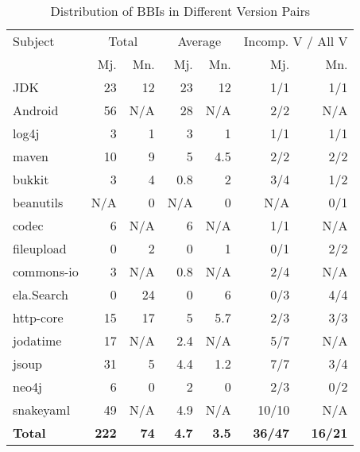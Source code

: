 \begin{table}
	\center 
	\caption{\label{table:incompVersions} Distribution of BBIs in Different Version Pairs}
		
		
	\begin{tabular}{|l|r|r|r|r|r|r|}
		\hline 
        Subject& 
        \multicolumn{2}{c|}{Total} & \multicolumn{2}{c|}{Average} & \multicolumn{2}{c|}{Incomp. V / All V}\\
        \cline{2-7}
                & Mj. & Mn. & Mj.  & Mn. & Mj. & Mn.        \\
        \hline
		JDK &  23 & 12 & 23 & 12   &  1/1 & 1/1  \\
		Android & 56 & N/A & 28 & N/A  & 2/2 &  N/A \\ %
		log4j  & 3  & 1 & 3  &  1   &  1/1 & 1/1  \\
		maven  &  10  & 9  & 5 & 4.5  & 2/2  & 2/2 \\
		bukkit & 3 & 4 & 0.8 & 2  & 3/4  & 1/2 \\
		beanutils & N/A & 0 & N/A & 0  & N/A &  0/1 \\
		codec & 6 &  N/A & 6 &  N/A &  1/1 & N/A \\
		fileupload & 0 & 2 & 0 & 1  & 0/1  & 2/2  \\
		commons-io  &  3 & N/A  & 0.8 & N/A &  2/4 & N/A  \\
		ela.Search  & 0  & 24 & 0 & 6  & 0/3 & 4/4 \\
		http-core &15  & 17 & 5 & 5.7 & 2/3 & 3/3 \\		
		jodatime  & 17 & N/A & 2.4 & N/A  &5/7  & N/A \\
		jsoup  & 31 & 5 & 4.4 & 1.2 &  7/7 & 3/4 \\
		neo4j  &  6 & 0 &  2  & 0  & 2/3 & 0/2  \\
		snakeyaml & 49 & N/A &4.9 & N/A & 10/10  & N/A \\
		\hline
		\textbf{Total} & \textbf{222} & \textbf{74} & \textbf{4.7} & \textbf{3.5} & \textbf{36/47}  & \textbf{16/21} \\
		\hline
	\end{tabular}
	\vspace{0.5cm}	
\end{table}
